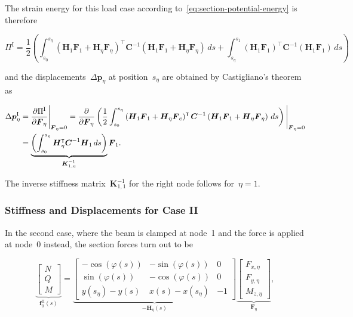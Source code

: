 The strain energy for this load case according to~\eqref{eq:section-potential-energy} is therefore

\begin{equation}
\Pi^{\mathrm{I}} = \frac{1}{2}\left(\int_{s_0}^{s_\eta} \left(\boldsymbol{H}_{1}\boldsymbol{F}_1 + \boldsymbol{H}_{\eta}\boldsymbol{F}_\eta\right)^\intercal\boldsymbol{C}^{-1}\left(\boldsymbol{H}_{1}\boldsymbol{F}_1 + \boldsymbol{H}_{\eta}\boldsymbol{F}_\eta\right)\,ds + \int_{s_\eta}^{s_1} \left(\boldsymbol{H}_{1}\boldsymbol{F}_1\right)^\intercal\boldsymbol{C}^{-1}\left(\boldsymbol{H}_{1}\boldsymbol{F}_1\right)\,ds\right)
\end{equation}

and the displacements~$\Delta\boldsymbol{p}_\eta$ at position~$s_\eta$ are obtained by Castigliano's theorem as

\begin{align}
\Delta\boldsymbol{p}^{\mathrm{I}}_\eta &= \frac{\partial \Pi^{\mathrm{I}}}{\partial \boldsymbol{F}_\eta}\Bigg|_{\boldsymbol{F}_\eta = 0} = \frac{\partial}{\partial \boldsymbol{F}_\eta}\left(\frac{1}{2}\int_{s_0}^{s_\eta} \left(\boldsymbol{H}_{1}\boldsymbol{F}_1 + \boldsymbol{H}_{\eta}\boldsymbol{F}_e\right)^\intercal\boldsymbol{C}^{-1}\left(\boldsymbol{H}_{1}\boldsymbol{F}_1 + \boldsymbol{H}_{\eta}\boldsymbol{F}_\eta\right)\,ds\right)\Bigg|_{\boldsymbol{F}_\eta = 0} \notag \\
&= \underbrace{\left(\int_{s_0}^{s_\eta} \boldsymbol{H}_\eta^\intercal\boldsymbol{C}^{-1}\boldsymbol{H}_1\,ds\right)}_{\boldsymbol{K}^{-1}_{1,\eta}}\boldsymbol{F}_1.
\end{align}

The inverse stiffness matrix~$\boldsymbol{K}^{-1}_{1,1}$ for the right node follows for~$\eta = 1$.

\subsubsection*{Stiffness and Displacements for Case II}

In the second case, where the beam is clamped at node~1 and the force is applied at node~0 instead, the section forces turn out to be

\begin{equation}
\underbrace{
\begin{bmatrix}
N \\ Q \\ M
\end{bmatrix}
}_{\boldsymbol{f}^{\mathrm{II}}_{\eta}(s)}
=
\underbrace{
\begin{bmatrix}
-\cos(\varphi(s)) & -\sin(\varphi(s)) & 0 \\
\sin(\varphi(s)) & -\cos(\varphi(s)) & 0 \\
y(s_\eta) - y(s) & x(s) - x(s_\eta) & -1
\end{bmatrix}
}_{-\boldsymbol{H}_{\eta}(s)}
\underbrace{
\begin{bmatrix}
F_{x,\eta} \\ F_{y,\eta} \\ M_{z,\eta}
\end{bmatrix}
}_{\boldsymbol{F}_\eta}, \label{eq:section-static-equilibrium-2}
\end{equation}

